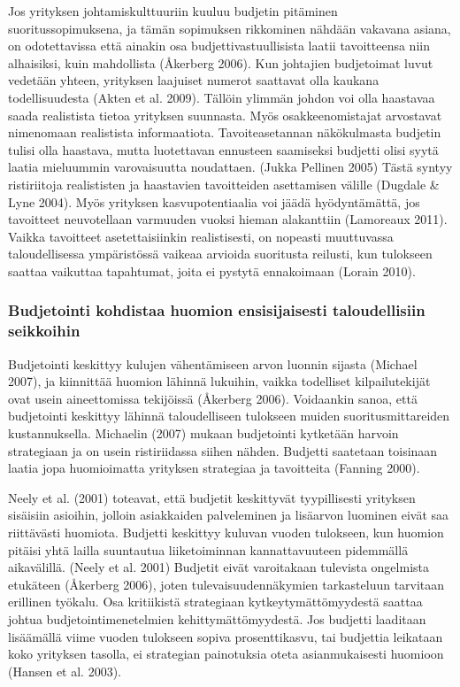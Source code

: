 \documentclass[12pt,a4paper,oneside,pdftex]{report}
\begin{document}
Jos yrityksen johtamiskulttuuriin kuuluu budjetin pitäminen suoritussopimuksena, ja tämän sopimuksen rikkominen nähdään vakavana asiana, on odotettavissa että ainakin osa budjettivastuullisista laatii tavoitteensa niin alhaisiksi, kuin mahdollista (Åkerberg 2006). Kun johtajien budjetoimat luvut vedetään yhteen, yrityksen laajuiset numerot saattavat olla kaukana todellisuudesta (Akten et al. 2009). Tällöin ylimmän johdon voi olla haastavaa saada realistista tietoa yrityksen suunnasta. Myös osakkeenomistajat arvostavat nimenomaan realistista informaatiota. Tavoiteasetannan näkökulmasta budjetin tulisi olla haastava, mutta luotettavan ennusteen saamiseksi budjetti olisi syytä laatia mieluummin varovaisuutta noudattaen. (Jukka Pellinen 2005) Tästä syntyy ristiriitoja realististen ja haastavien tavoitteiden asettamisen välille (Dugdale & Lyne 2004). Myös yrityksen kasvupotentiaalia voi jäädä hyödyntämättä, jos tavoitteet neuvotellaan varmuuden vuoksi hieman alakanttiin (Lamoreaux 2011). Vaikka tavoitteet asetettaisiinkin realistisesti, on nopeasti muuttuvassa taloudellisessa ympäristössä vaikeaa arvioida suoritusta reilusti, kun tulokseen saattaa vaikuttaa tapahtumat, joita ei pystytä ennakoimaan (Lorain 2010).

\subsubsection{Budjetointi kohdistaa huomion ensisijaisesti taloudellisiin seikkoihin}

Budjetointi keskittyy kulujen vähentämiseen arvon luonnin sijasta (Michael 2007), ja kiinnittää huomion lähinnä lukuihin, vaikka todelliset kilpailutekijät ovat usein aineettomissa tekijöissä (Åkerberg 2006). Voidaankin sanoa, että budjetointi keskittyy lähinnä taloudelliseen tulokseen muiden suoritusmittareiden kustannuksella. Michaelin (2007) mukaan budjetointi kytketään harvoin strategiaan ja on usein ristiriidassa siihen nähden. Budjetti saatetaan toisinaan laatia jopa huomioimatta yrityksen strategiaa ja tavoitteita (Fanning 2000).

Neely et al. (2001) toteavat, että budjetit keskittyvät tyypillisesti yrityksen sisäisiin asioihin, jolloin asiakkaiden palveleminen ja lisäarvon luominen eivät saa riittävästi huomiota. Budjetti keskittyy kuluvan vuoden tulokseen, kun huomion pitäisi yhtä lailla suuntautua liiketoiminnan kannattavuuteen pidemmällä aikavälillä. (Neely et al. 2001) Budjetit eivät varoitakaan tulevista ongelmista etukäteen (Åkerberg 2006), joten tulevaisuudennäkymien tarkasteluun tarvitaan erillinen työkalu. Osa kritiikistä strategiaan kytkeytymättömyydestä saattaa johtua budjetointimenetelmien kehittymättömyydestä. Jos budjetti laaditaan lisäämällä viime vuoden tulokseen sopiva prosenttikasvu, tai budjettia leikataan koko yrityksen tasolla, ei strategian painotuksia oteta asianmukaisesti huomioon (Hansen et al. 2003).
\end{document}
